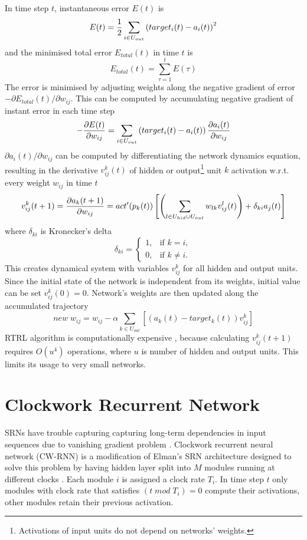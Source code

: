 \documentclass[12pt,oneside]{fithesis2}
\begin{document}
In time step $t$, instantaneous error $E(t)$ is
$$E(t) = {1 \over 2}\sum\limits_{i \in U_{out}}\left(target_i(t) - a_i(t)\right)^2$$
and the minimised total error $E_{total}(t)$ in time $t$  is
$$E_{total}(t) =\sum\limits_{\tau=1}^t E(\tau)$$
The error is minimised by adjusting weights along the negative gradient of error $-\partial E_{total}(t) / \partial w_{ij}$. This can be computed by accumulating negative gradient of instant error in each time step
$$-{{\partial E(t)} \over {\partial w_{ij}}} = \sum\limits_{i \in U_{out}} \left( target_i(t) - a_i(t) \right) {{\partial a_i(t)} \over {\partial w_{ij}}}$$
${\partial a_i(t)} / {\partial w_{ij}}$ can be computed by differentiating the network dynamics equation, resulting in the derivative $v^k_{ij}(t)$ of hidden or output\footnote{Activations of input units do not depend on networks' weights.} unit $k$ activation w.r.t. every weight $w_{ij}$ in time $t$
$$ v^k_{ij}(t+1) = {{\partial a_k(t+1)} \over {\partial w_{ij}}} = act'(p_k(t)) \left[ \left(\sum\limits_{l \in U_{hid} \cup U_{out}}  w_{lk}  v_{ij}^l(t)\right) + \delta_{ki} a_j(t) \right] $$
where $\delta_{ki}$ is Kronecker's delta
$$\delta_{ki} =
    \begin{cases}
            1, &         \text{if } k=i,\\
            0, &         \text{if } k\neq i.
    \end{cases}$$
This creates dynamical system with variables $v^k_{ij}$ for all hidden and output units. Since the initial state of the network is independent from its weights, initial value can be set $v^k_{ij}(0) = 0$. Network's weights are then updated along the accumulated trajectory
$$new \; w_{ij} =  w_{ij} - \alpha \sum\limits_{k \in U_{out}} \left[ \left(a_k(t) - target_k(t) \right) v_{ij}^k \right]$$
RTRL algorithm is computationally expensive \cite{minds-jacobs}, because calculating $v^k_{ij}(t+1)$ requires $O(u^4)$ operations, where $u$ is number of hidden and output units. This limits its usage to very small networks.

\section{Clockwork Recurrent Network}
SRNs have trouble capturing capturing long-term dependencies in input sequences due to vanishing gradient problem \cite{Hochreiter01gradientflow}. Clockwork recurrent neural network (CW-RNN) is a modification of Elman's SRN architecture designed to solve this problem by having hidden layer split into $M$ modules running at different clocks \cite{cw-rnn}.
Each module $i$ is assigned a clock rate $T_i$. In time step $t$ only modules with clock rate that satisfies $(t \; mod \; T_i) = 0$ compute their activations, other modules retain their previous activation.  \par
\end{document}
